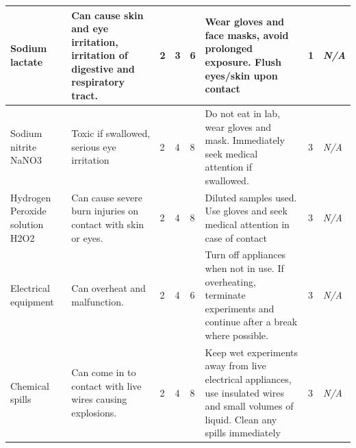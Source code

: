\begin{appendices}
\begin{longtable}{|p{}|p{}|p{}|p{}|p{}|p{}|p{}|p{}|}
        Sodium lactate & Can cause skin and eye irritation, irritation of digestive and respiratory tract. & 2 & 3 & 6 & Wear gloves and face masks, avoid prolonged exposure. Flush eyes/skin upon contact & 1 & \textit{N/A}\\ \hline
        
        Sodium nitrite NaNO3 & Toxic if swallowed, serious eye irritation & 2 & 4 & 8 & Do not eat in lab, wear gloves and mask. Immediately seek medical attention if swallowed. & 3 & \textit{N/A}\\ \hline
        
        \pagebreak
        
        Hydrogen Peroxide solution H2O2 &  Can cause severe burn injuries on contact with skin or eyes. & 2 & 4 & 8 & Diluted samples used. Use gloves and seek medical attention in case of contact & 3 & \textit{N/A}\\ \hline
        
        
        Electrical equipment & Can overheat and malfunction. & 2 & 4 & 6 & Turn off appliances when not in use. If overheating, terminate experiments and continue after a break where possible. & 3 & \textit{N/A}\\ \hline
        
        Chemical spills & Can come in to contact with live wires causing explosions. & 2 & 4 & 8 & Keep wet experiments away from live electrical appliances, use insulated wires and small volumes of liquid. Clean any spills immediately & 3 & \textit{N/A}\\ \hline
    \end{longtable}




\end{appendices}